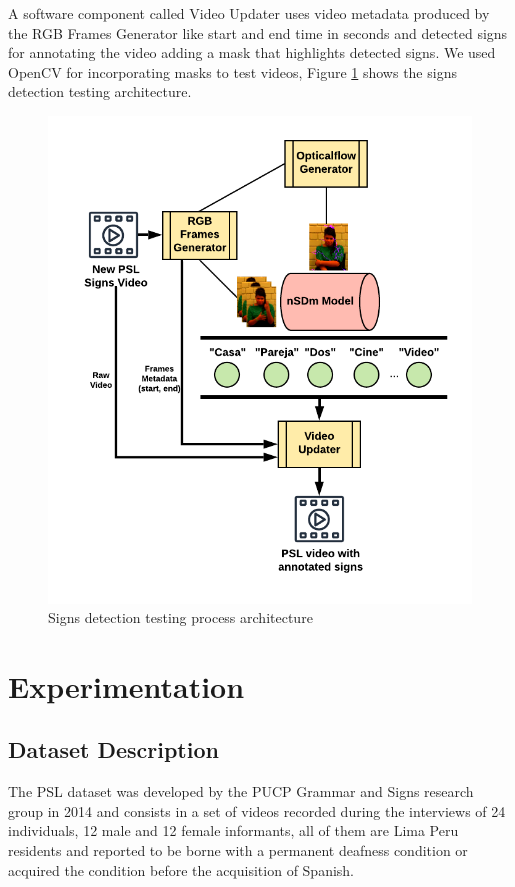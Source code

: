 \documentclass[twocolumn,conference]{article}
\begin{document}
A software component called Video Updater uses video metadata produced by the RGB Frames Generator like start and end time in seconds and detected signs for annotating the video adding a mask that highlights detected signs. We used OpenCV for incorporating masks to test videos, Figure \ref{fig:video-testing-architecture} shows the signs detection testing architecture.
\begin{figure}[hbt!]
\includegraphics[width=\linewidth]{images/new-video-test-architecture.png}
\caption{Signs detection testing process architecture}
\label{fig:video-testing-architecture}
\end{figure}

\section{Experimentation}\label{experimentation}
\subsection{Dataset Description \cite{lsp_dataset}}\label{datasetdesc}
The PSL dataset was developed by the PUCP Grammar and Signs research group in 2014 and consists in a set of videos recorded during the interviews of 24 individuals, 12 male and 12 female informants, all of them are Lima Peru residents and reported to be borne with a permanent deafness condition or acquired the condition before the acquisition of Spanish. 
\end{document}
